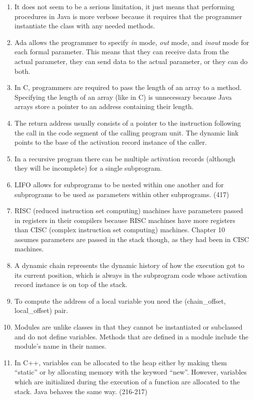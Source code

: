 \begin{answer}
\begin{enumerate}
\item It does not seem to be a serious limitation, it just means that performing procedures in Java is more verbose because it requires that the programmer instantiate the class with any needed methods.
\item Ada allows the programmer to specify \textit{in} mode, \textit{out} mode, and \textit{inout} mode for each formal parameter.  This means that they can receive data from the actual parameter, they can send data to the actual parameter, or they can do both.
\item In C, programmers are required to pass the length of an array to a method. Specifying the length of an array (like in C) is unnecessary because Java arrays store a pointer to an address containing their length.
\item The return address usually consists of a pointer to the instruction following the call in the code segment of the calling program unit.  The dynamic link points to the base of the activation record instance of the caller.
\item In a recursive program there can be multiple activation records (although they will be incomplete) for a single subprogram.
\item LIFO allows for subprograms to be nested within one another and for subprograms to be used as parameters within other subprograms. (417)
\item RISC (reduced instruction set computing) machines have parameters passed in registers in their compilers because RISC machines have more registers than CISC (complex instruction set computing) machines. Chapter 10 assumes parameters are passed in the stack though, as they had been in CISC machines.
\item A dynamic chain represents the dynamic history of how the execution got to its current position, which is always in the subprogram code whose activation record instance is on top of the stack.
\item To compute the address of a local variable you need the (chain_offset, local_offset) pair.
\item Modules are unlike classes in that they cannot be instantiated or subclassed and do not define variables. Methods that are defined in a module include the module’s name in their names.
\item In C++, variables can be allocated to the heap either by making them “static” or by allocating memory with the keyword “new”. However, variables which are initialized during the execution of a function are allocated to the stack. Java behaves the same way. (216-217)

\end{enumerate}
\end{answer}
